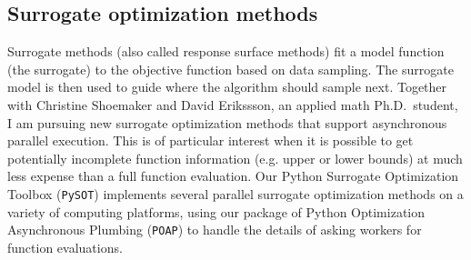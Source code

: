 \documentclass[11pt]{amsart}
\begin{document}
\subsection*{Surrogate optimization methods}

Surrogate methods (also called response surface methods) fit a model
function (the surrogate) to the objective function based on data
sampling.  The surrogate model is then used to guide where the algorithm
should sample next.  Together with Christine Shoemaker and David
Erikssson, an applied math Ph.D.~student, I am pursuing new surrogate
optimization methods that support asynchronous parallel execution.  This
is of particular interest when it is possible to get potentially
incomplete function information (e.g. upper or lower bounds) at much
less expense than a full function evaluation. Our Python Surrogate
Optimization Toolbox ({\tt PySOT}) implements several parallel surrogate
optimization methods on a variety of computing platforms, using our
package of Python Optimization Asynchronous Plumbing ({\tt POAP}) to
handle the details of asking workers for function evaluations.

\newpage


\end{document}
